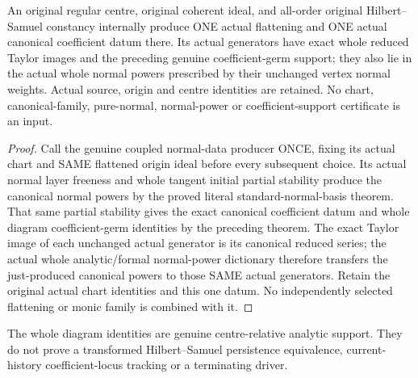\begin{theorem}
\label{hir:actual-original-hs-centre-canonical-coefficient-data}
\leanok
An original regular centre, original coherent ideal, and all-order original
Hilbert--Samuel constancy internally produce ONE actual flattening and ONE
actual canonical coefficient datum there. Its actual generators have exact
whole reduced Taylor images and the preceding genuine coefficient-germ support;
they also lie in the actual whole normal powers prescribed by their unchanged
vertex normal weights. Actual source, origin and centre identities are retained.
No chart, canonical-family, pure-normal, normal-power or coefficient-support
certificate is an input.
\end{theorem}
\begin{proof}
Call the genuine coupled normal-data producer ONCE, fixing its actual chart
and SAME flattened origin ideal before every subsequent choice. Its actual
normal layer freeness and whole tangent initial partial stability produce the
canonical normal powers by the proved literal standard-normal-basis theorem.
That same partial stability gives the exact canonical coefficient datum and
whole diagram coefficient-germ identities by the preceding theorem.
The exact Taylor image of each unchanged actual generator is its canonical
reduced series; the actual whole analytic/formal normal-power dictionary
therefore transfers the just-produced canonical powers to those SAME actual
generators. Retain the original actual chart identities and this one datum.
No independently selected flattening or monic family is combined with it.
\end{proof}

The whole diagram identities are genuine centre-relative analytic support.
They do not prove a transformed Hilbert--Samuel persistence equivalence,
current-history coefficient-locus tracking or a terminating driver.
